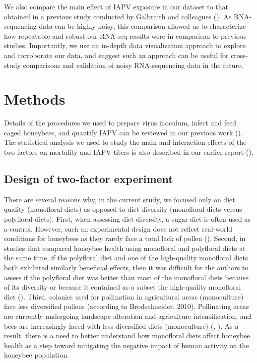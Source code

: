 \documentclass[11pt,a4paper,oldfontcommands,openany]{memoir}
\numberwithin{equation}{section} %
\begin{document}
We also compare the main effect of IAPV exposure in our dataset to that obtained in a previous study conducted by Galbraith and colleagues (\citealt{galbraith}). As RNA-sequencing data can be highly noisy, this comparison allowed us to characterize how repeatable and robust our RNA-seq results were in comparison to previous studies. Importantly, we use an in-depth data visualization approach to explore and corroborate our data, and suggest such an approach can be useful for cross-study comparisons and validation of noisy RNA-sequencing data in the future.

\section{Methods}

Details of the procedures we used to prepare virus inoculum, infect and feed caged honeybees, and quantify IAPV can be reviewed in our previous work (\citealt{adamInt}). The statistical analysis we used to study the main and interaction effects of the two factors on mortality and IAPV titers is also described in our earlier report (\citealt{adamInt}).

\subsection{Design of two-factor experiment}

There are several reasons why, in the current study, we focused only on diet quality (monofloral diets) as opposed to diet diversity (monofloral diets versus polyfloral diets). First, when assessing diet diversity, a sugar diet is often used as a control. However, such an experimental design does not reflect real-world conditions for honeybees as they rarely face a total lack of pollen (\citealt{DiPasquale}). Second, in studies that compared honeybee health using monofloral and polyfloral diets at the same time, if the polyfloral diet and one of the high-quality monofloral diets both exhibited similarly beneficial effects, then it was difficult for the authors to assess if the polyfloral diet was better than most of the monofloral diets because of its diversity or because it contained as a subset the high-quality monofloral diet (\citealt{DiPasquale}). Third, colonies used for pollination in agricultural areas (monoculture) face less diversified pollens (according to Brodschneider, 2010). Pollinating areas are currently undergoing landscape alteration and agriculture intensification, and bees are increasingly faced with less diversified diets (monoculture) (\citealt{landscape1}, \citealt{brodschneider}). As a result, there is a need to better understand how monofloral diets affect honeybee health as a step toward mitigating the negative impact of human activity on the honeybee population.
\end{document}
